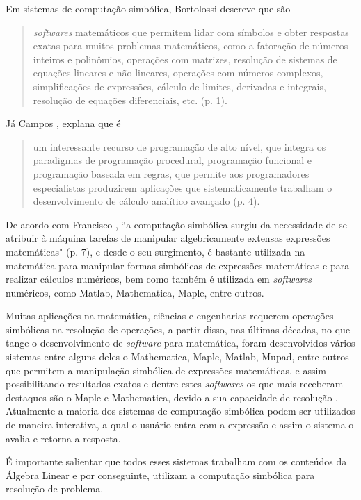 Em sistemas de computação simbólica, Bortolossi \cite{2012:Humberto} descreve que são
\begin{quote}
    \textit{softwares} matemáticos que permitem lidar com símbolos e obter respostas exatas para muitos problemas matemáticos, como a fatoração de números inteiros e polinômios, operações com matrizes, resolução de sistemas de equações lineares e não lineares, operações com números complexos, simplificações de expressões, cálculo de limites, derivadas e integrais, resolução de equações diferenciais, etc. (p. 1).
\end{quote}

Já Campos \cite{2015:Lidio}, explana que é
\begin{quote}
    um interessante recurso de programação de alto nível, que integra os paradigmas de programação procedural, programação funcional e programação baseada em regras, que permite aos programadores especialistas produzirem aplicações que sistematicamente trabalham o desenvolvimento de cálculo analítico avançado (p. 4).  
\end{quote}

De acordo com Francisco \cite{1996:Francisco}, ``a computação simbólica surgiu da necessidade de se atribuir à máquina tarefas de manipular algebricamente extensas expressões matemáticas" (p. 7), e desde o seu surgimento, é bastante utilizada na matemática para manipular formas simbólicas de expressões matemáticas e para realizar cálculos numéricos, bem como também é utilizada em \textit{softwares} numéricos, como Matlab, Mathematica, Maple, entre outros.

Muitas aplicações na matemática, ciências e engenharias requerem operações simbólicas na resolução de operações, a partir disso, nas últimas décadas, no que tange o desenvolvimento de \textit{software} para matemática, foram desenvolvidos vários sistemas entre alguns deles o Mathematica, Maple, Matlab, Mupad, entre outros que permitem a manipulação simbólica de expressões matemáticas, e assim possibilitando resultados exatos e dentre estes \textit{softwares} os que mais receberam destaques são o Maple e Mathematica, devido a sua capacidade de resolução \cite{2007:Valesca}. Atualmente a maioria dos sistemas de computação simbólica podem ser utilizados de maneira interativa, a qual o usuário entra com a expressão e assim o sistema o avalia e retorna a resposta.

É importante salientar que todos esses sistemas trabalham com os conteúdos da Álgebra Linear e por conseguinte, utilizam a computação simbólica para resolução de problema.

